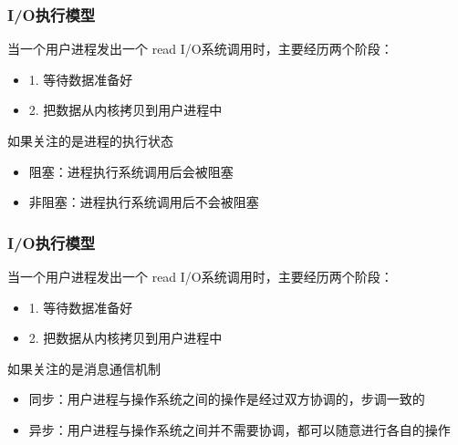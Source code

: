 \begin{frame}[fragile]
    \frametitle{I/O执行模型}
    当一个用户进程发出一个 read I/O系统调用时，主要经历两个阶段：
    \begin{itemize}
        \item 1. 等待数据准备好 
        \item 2. 把数据从内核拷贝到用户进程中
     \end{itemize}       
    如果关注的是进程的执行状态
        \begin{itemize}
            \item 阻塞：进程执行系统调用后会被阻塞
            \item 非阻塞：进程执行系统调用后不会被阻塞
        \end{itemize}

\end{frame}
\begin{frame}[fragile]
    \frametitle{I/O执行模型}
    当一个用户进程发出一个 read I/O系统调用时，主要经历两个阶段：
    \begin{itemize}
        \item 1. 等待数据准备好 
        \item 2. 把数据从内核拷贝到用户进程中
    \end{itemize}       
    如果关注的是消息通信机制
    \begin{itemize}
        \item 同步：用户进程与操作系统之间的操作是经过双方协调的，步调一致的
        \item 异步：用户进程与操作系统之间并不需要协调，都可以随意进行各自的操作
    \end{itemize}
    
\end{frame}

